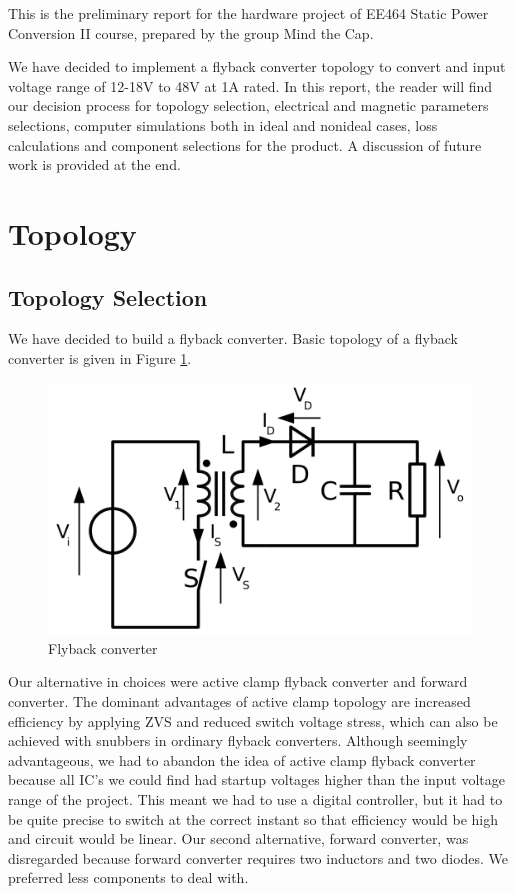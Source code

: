 \documentclass[12pt]{article}
\begin{document}
This is the preliminary report for the hardware project of EE464 Static Power Conversion II course, prepared by the group Mind the Cap. 

We have decided to implement a flyback converter topology to convert and input voltage range of 12-18V to 48V at 1A rated. In this report, the reader will find our decision process for topology selection, electrical and magnetic parameters selections, computer simulations both in ideal and nonideal cases, loss calculations and component selections for the product. A discussion of future work is provided at the end.

\section{Topology}

    \subsection{Topology Selection}
    We have decided to build a flyback converter. Basic topology of a flyback converter is given in Figure \ref{fig:flyback}.

    \begin{figure}[H]
        \centering
        \includegraphics[width = \textwidth]{img/flyback.png}
        \caption{Flyback converter}
        \label{fig:flyback}
    \end{figure}

    Our alternative in choices were active clamp flyback converter and forward converter. The dominant advantages of active clamp topology are increased efficiency by applying ZVS and reduced switch voltage stress, which can also be achieved with snubbers in ordinary flyback converters. Although seemingly advantageous, we had to abandon the idea of active clamp flyback converter because all IC's we could find had startup voltages higher than the input voltage range of the project. This meant we had to use a digital controller, but it had to be quite precise to switch at the correct instant so that efficiency would be high and circuit would be linear. Our second alternative, forward converter, was disregarded because forward converter requires two inductors and two diodes. We preferred less components to deal with.
\end{document}
